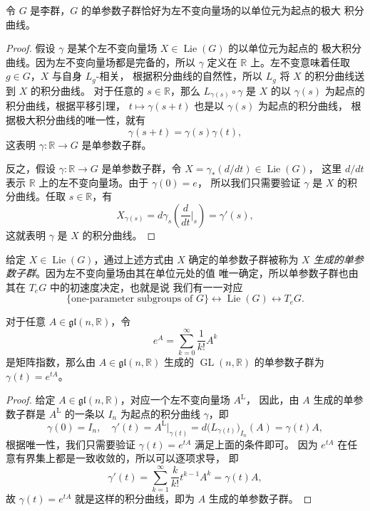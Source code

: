 \documentclass[fontset=none]{Notes}
\DeclareMathOperator\GL{GL}
\DeclareMathOperator\Lie{Lie}
\newcommand{\LL}{{\mathrm{L}}}
\newcommand{\lie}[1]{\mathfrak{#1}}
\begin{document}
\begin{theorem}[单参数子群的特征]
  令 $G$ 是李群，$G$ 的单参数子群恰好为左不变向量场的以单位元为起点的极大
  积分曲线。
\end{theorem}
\begin{proof}
  假设 $\gamma$ 是某个左不变向量场 $X\in\Lie(G)$ 的以单位元为起点的
  极大积分曲线。因为左不变向量场都是完备的，所以 $\gamma$ 
  定义在 $\mathbb{R}$ 上。左不变意味着任取 $g\in G$，$X$ 与自身 $L_g$-相关，
  根据积分曲线的自然性，所以 $L_g$ 将 $X$ 的积分曲线送到 $X$ 的积分曲线。
  对于任意的 $s\in \mathbb{R}$，那么 $L_{\gamma(s)}\circ\gamma$
  是 $X$ 的以 $\gamma(s)$ 为起点的积分曲线，根据平移引理，
  $t\mapsto \gamma(s+t)$ 也是以 $\gamma(s)$ 为起点的积分曲线，
  根据极大积分曲线的唯一性，就有
  \[
    \gamma(s+t)=\gamma(s)\gamma(t),  
  \]
  这表明 $\gamma:\mathbb{R}\to G$ 是单参数子群。

  反之，假设 $\gamma:\mathbb{R}\to G$ 是单参数子群，令 $X=\gamma_*(d/dt)\in\Lie(G)$，
  这里 $d/dt$ 表示 $\mathbb{R}$ 上的左不变向量场。由于 $\gamma(0)=e$，
  所以我们只需要验证 $\gamma$ 是 $X$ 的积分曲线。任取 $s\in \mathbb{R}$，有
  \[
    X_{\gamma(s)}=d \gamma_{s}\left(\frac{d}{dt}\bigg|_s\right)
    =\gamma'(s),
  \]
  这就表明 $\gamma$ 是 $X$ 的积分曲线。
\end{proof}

给定 $X\in\Lie(G)$，通过上述方式由 $X$ 确定的单参数子群被称为
\emph{$X$ 生成的单参数子群}。因为左不变向量场由其在单位元处的值
唯一确定，所以单参数子群也由其在 $T_eG$ 中的初速度决定，也就是说
我们有一一对应
\[
  \{\text{one-parameter subgroups of $G$}\}\longleftrightarrow
  \Lie(G)  \longleftrightarrow T_eG.
\]

\begin{proposition}
  对于任意 $A\in\lie{gl}(n,\mathbb{R})$，令
  \[
    e^A=\sum_{k=0}^\infty\frac{1}{k! }A^k  
  \]
  是矩阵指数，那么由 $A\in\lie{gl}(n,\mathbb{R})$ 生成的
  $\GL(n,\mathbb{R})$ 的单参数子群为 $\gamma(t)=e^{tA}$。
\end{proposition}
\begin{proof}
  给定 $A\in\lie{gl}(n,\mathbb{R})$，对应一个左不变向量场 $A^{\LL}$，
  因此，由 $A$ 生成的单参数子群是 $A^{\LL}$ 的一条以 $I_n$ 为起点的积分曲线
  $\gamma$，即
  \[
    \gamma(0)=I_n,  \quad
    \gamma'(t)=A^{\LL}|_{\gamma(t)}=d\bigl(L_{\gamma(t)}\bigr)_{I_n}
    \left(A\right)=\gamma(t)A,
  \]
  根据唯一性，我们只需要验证 $\gamma(t)=e^{tA}$ 满足上面的条件即可。
  因为 $e^{tA}$ 在任意有界集上都是一致收敛的，所以可以逐项求导，
  即
  \[
    \gamma'(t)=\sum_{k=1}^\infty\frac{k}{k!}t^{k-1}A^k
    =\gamma(t)A,  
  \]
  故 $\gamma(t)=e^{tA}$ 就是这样的积分曲线，即为 $A$ 生成的单参数子群。
\end{proof}
\end{document}
